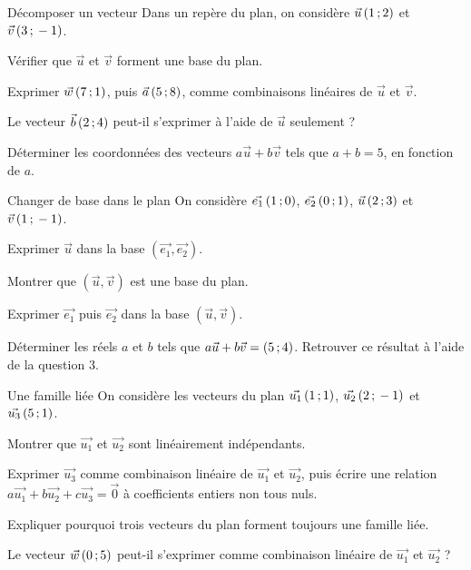 \begin{exercice}[1]{Décomposer un vecteur}
Dans un repère du plan, on considère $\vec u\,(1\,{;}\,2)$ et $\vec v\,(3\,{;}\,-1)$.
\begin{questions}
  \item Vérifier que $\vec u$ et $\vec v$ forment une base du plan.
  \item Exprimer $\vec w\,(7\,{;}\,1)$, puis $\vec a\,(5\,{;}\,8)$, comme combinaisons linéaires de $\vec u$ et $\vec v$.
  \item Le vecteur $\vec b\,(2\,{;}\,4)$ peut-il s'exprimer à l'aide de $\vec u$ seulement ?
  \item Déterminer les coordonnées des vecteurs $a\vec u+b\vec v$ tels que $a+b=5$, en fonction de $a$.
\end{questions}
\end{exercice}


\begin{exercice}[2]{Changer de base dans le plan}
On considère $\vec{e_1}\,(1\,{;}\,0)$, $\vec{e_2}\,(0\,{;}\,1)$, $\vec u\,(2\,{;}\,3)$ et $\vec v\,(1\,{;}\,-1)$.
\begin{questions}
  \item Exprimer $\vec u$ dans la base $(\vec{e_1},\vec{e_2})$.
  \item Montrer que $(\vec u,\vec v)$ est une base du plan.
  \item Exprimer $\vec{e_1}$ puis $\vec{e_2}$ dans la base $(\vec u,\vec v)$.
  \item Déterminer les réels $a$ et $b$ tels que $a\vec u+b\vec v=(5\,{;}\,4)$. Retrouver ce résultat à l'aide de la question 3.
\end{questions}
\end{exercice}

\begin{exercice}[2]{Une famille liée}
On considère les vecteurs du plan $\vec{u_1}\,(1\,{;}\,1)$, $\vec{u_2}\,(2\,{;}\,-1)$ et $\vec{u_3}\,(5\,{;}\,1)$.
\begin{questions}
  \item Montrer que $\vec{u_1}$ et $\vec{u_2}$ sont linéairement indépendants.
  \item Exprimer $\vec{u_3}$ comme combinaison linéaire de $\vec{u_1}$ et $\vec{u_2}$, puis écrire une relation
    $a\vec{u_1}+b\vec{u_2}+c\vec{u_3}=\vec0$ à coefficients entiers non tous nuls.
  \item Expliquer pourquoi trois vecteurs du plan forment toujours une famille liée.
  \item Le vecteur $\vec w\,(0\,{;}\,5)$ peut-il s'exprimer comme combinaison linéaire de $\vec{u_1}$ et $\vec{u_2}$ ?
\end{questions}
\end{exercice}

